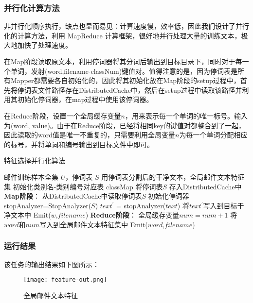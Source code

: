\documentclass[lang=cn,11pt]{elegantpaper}
\begin{document}
\subsubsection{并行化计算方法}
非并行化顺序执行，缺点也显而易见：计算速度慢，效率低，因此我们设计了并行化的计算方法，利用 MapReduce 计算框架，很好地并行处理大量的训练文本，极大地加快了处理速度。\par
在Map阶段读取原文本，利用停词器将其分词后输出到目标目录下，同时对于每一个单词，发射(word,filename-classNum)键值对。值得注意的是，因为停词表是所有Mapper都需要各自初始化的，因此将其初始化放在Map阶段的setup过程中，首先将停词表文件路径存在DistributedCache中，然后在setup过程中读取该路径并利用其初始化停词器，在map过程中使用该停词器。\par
在Reduce阶段，设置一个全局缓存变量$n$，用来表示每一个单词的唯一标号。输入为(word, value)。由于在Reduce阶段，已经将相同key的键值对都整合到了一起，因此读取的word值是唯一不重复的，只需要利用全局变量$n$为每一个单词分配相应的标号，并将单词和编号输出到目标文件中即可。\par
\begin{algorithm}[htb]  
  \caption{特征选择并行化算法}  
  \label{alg:Framwork}
  \begin{algorithmic}[1]
    \Require
    邮件训练样本全集 $U$，停词表 $S$
    \Ensure 
    用停词表分割后的干净文本，全局邮件文本特征集
    \State 初始化类别名-类别编号对应表 classMap
    \State 将停词表$S$ 存入DistributedCache中
    \State \textbf{Map阶段}：
    \State 从DistributedCache中读取停词表$S$
    \State 初始化停词器 stopAnalyzer=StopAnalyzer($S$)
    \EndFunction
      \State $text^\prime$ = stopAnalyzer($text$)
      \State 将$text^\prime$写入到目标干净文本中
        \State Emit($w$,$filename$)
      \EndFor
    \EndFunction
    \State \textbf{Reduce阶段}：
      \State 全局缓存变量$num=num+1$
      \State 将$word$和$num$写入到全局邮件文本特征集中
      \State Emit($word$,$filename$)
    \EndFunction
  \end{algorithmic}
\end{algorithm}

\subsubsection{运行结果}
该任务的输出结果如下图所示：
\begin{figure}[htbp]
	\centering
	\texttt{[image: feature-out.png]}
	\caption{全局邮件文本特征 \label{fig:feature-out}}
\end{figure}
\end{document}
